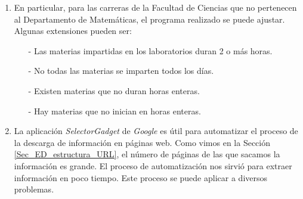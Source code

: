 \begin{enumerate}
\item En particular, para las carreras de la Facultad de Ciencias que no pertenecen al Departamento de Matemáticas, el programa realizado se puede ajustar. Algunas extensiones pueden ser: %

%
%
%

\begin{itemize}
\item[-] Las materias impartidas en los laboratorios duran 2 o más horas.

\item[-] No todas las materias se imparten todos los días.

\item[-] Existen materias que no duran horas enteras.

\item[-] Hay materias que no inician en horas enteras.
\end{itemize}

\item La aplicación \textit{SelectorGadget} de \textit{Google} es útil para automatizar el proceso de la descarga de información en páginas web. Como vimos en la Sección \ref{Sec_ED_estructura_URL}, el número de páginas de las que sacamos la información es grande. El proceso de automatización nos sirvió para extraer información en poco tiempo. Este proceso se puede aplicar a diversos problemas. %

\end{enumerate}

